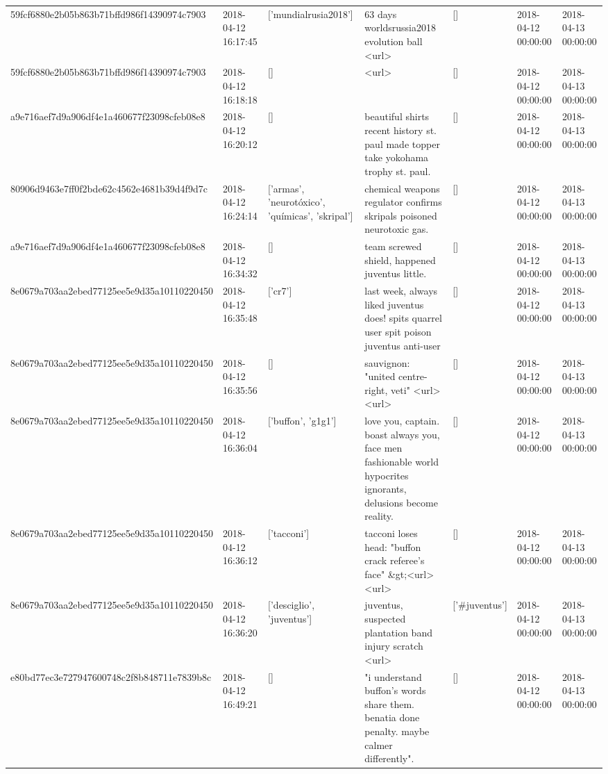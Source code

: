\begin{tabular}{lllllll}
59fcf6880e2b05b863b71bffd986f14390974c7903 & 2018-04-12 16:17:45 & ['mundialrusia2018'] & 63 days worldsrussia2018 evolution ball <url> & [] & 2018-04-12 00:00:00 & 2018-04-13 00:00:00 \\
59fcf6880e2b05b863b71bffd986f14390974c7903 & 2018-04-12 16:18:18 & [] & <url> & [] & 2018-04-12 00:00:00 & 2018-04-13 00:00:00 \\
a9e716aef7d9a906df4e1a460677f23098cfeb08e8 & 2018-04-12 16:20:12 & [] & beautiful shirts recent history st. paul made topper take yokohama trophy st. paul. & [] & 2018-04-12 00:00:00 & 2018-04-13 00:00:00 \\
80906d9463e7ff0f2bde62c4562e4681b39d4f9d7c & 2018-04-12 16:24:14 & ['armas', 'neurotóxico', 'químicas', 'skripal'] & chemical weapons regulator confirms skripals poisoned neurotoxic gas. & [] & 2018-04-12 00:00:00 & 2018-04-13 00:00:00 \\
a9e716aef7d9a906df4e1a460677f23098cfeb08e8 & 2018-04-12 16:34:32 & [] & team screwed shield, happened juventus little. & [] & 2018-04-12 00:00:00 & 2018-04-13 00:00:00 \\
8e0679a703aa2ebed77125ee5e9d35a10110220450 & 2018-04-12 16:35:48 & ['cr7'] & last week, always liked juventus does! spits quarrel user spit poison juventus anti-user & [] & 2018-04-12 00:00:00 & 2018-04-13 00:00:00 \\
8e0679a703aa2ebed77125ee5e9d35a10110220450 & 2018-04-12 16:35:56 & [] & sauvignon: "united centre-right, veti" <url> <url> & [] & 2018-04-12 00:00:00 & 2018-04-13 00:00:00 \\
8e0679a703aa2ebed77125ee5e9d35a10110220450 & 2018-04-12 16:36:04 & ['buffon', 'g1g1'] & love you, captain. boast always you, face men fashionable world hypocrites ignorants, delusions become reality. & [] & 2018-04-12 00:00:00 & 2018-04-13 00:00:00 \\
8e0679a703aa2ebed77125ee5e9d35a10110220450 & 2018-04-12 16:36:12 & ['tacconi'] & tacconi loses head: "buffon crack referee's face" \&gt;<url> <url> & [] & 2018-04-12 00:00:00 & 2018-04-13 00:00:00 \\
8e0679a703aa2ebed77125ee5e9d35a10110220450 & 2018-04-12 16:36:20 & ['desciglio', 'juventus'] & juventus, suspected plantation band injury scratch <url> & ['#juventus'] & 2018-04-12 00:00:00 & 2018-04-13 00:00:00 \\
e80bd77ec3e727947600748c2f8b848711e7839b8c & 2018-04-12 16:49:21 & [] & "i understand buffon's words share them. benatia done penalty. maybe calmer differently". & [] & 2018-04-12 00:00:00 & 2018-04-13 00:00:00 \\

\end{tabular}
